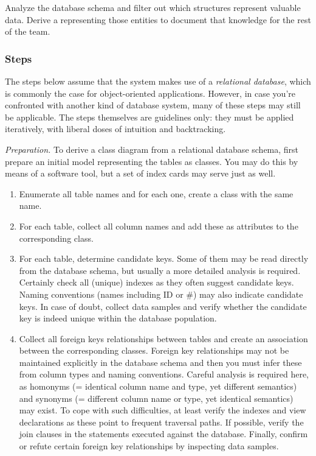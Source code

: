 \documentclass[a4paper,10pt,twoside]{book}
\begin{document}
Analyze the database schema and filter out which structures represent valuable data. Derive 
a  representing those entities to document that knowledge for 
the rest of the team.

\subsubsection*{Steps}

The steps below assume that the system makes use of a \emph{relational database}, which is 
commonly the case for object-oriented applications. However, in case you're confronted with 
another kind of database system, many of these steps may still be applicable. The steps 
themselves are guidelines only: they must be applied iteratively, with liberal doses of 
intuition and backtracking.

\noindent
\emph{Preparation.}
To derive a class diagram from a relational database schema, first prepare an initial model 
representing the tables as classes. You may do this by means of a software tool, but a set 
of index cards may serve just as well.

\begin{enumerate}
  \item Enumerate all table names and for each one, create a class with the same name.

  \item For each table, collect all column names and add these as attributes to the 
corresponding class.

  \item For each table, determine candidate keys. Some of them may be read directly from 
the database schema, but usually a more detailed analysis is required. Certainly check all 
(unique) indexes as they often suggest candidate keys. Naming conventions (names including 
ID or \#) may also indicate candidate keys. In case of doubt, collect data samples and 
verify whether the candidate key is indeed unique within the database population.

  \item Collect all foreign keys relationships between tables and create an association 
between the corresponding classes. Foreign key relationships may not be maintained 
explicitly in the database schema and then you must infer these from column types and 
naming conventions. Careful analysis is required here, as homonyms (= identical column name 
and type, yet different semantics) and synonyms (= different column name or type, yet 
identical semantics) may exist. To cope with such difficulties, at least verify the indexes 
and view declarations as these point to frequent traversal paths. If possible, verify the 
join clauses in the  statements executed against the database. Finally, confirm or 
refute certain foreign key relationships by inspecting data samples.

\end{enumerate}
\end{document}
